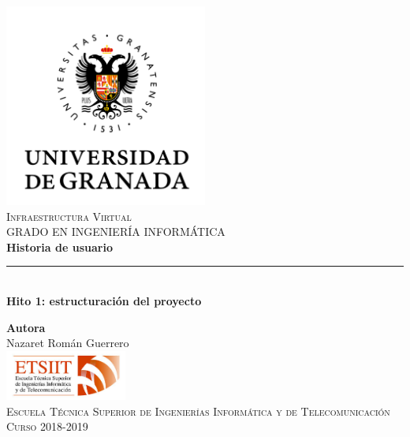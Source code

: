 \documentclass[11pt,a4paper]{article}
\begin{document}
\begin{titlepage}

\begin{minipage}{\textwidth}

\centering
\includegraphics[width=0.5\textwidth]{logo.png}\\

\textsc{\Large Infraestructura Virtual\\[0.2cm]}
\textsc{GRADO EN INGENIERÍA INFORMÁTICA}\\[1cm]

{\Huge\bfseries Historia de usuario\\}
\noindent\rule[-1ex]{\textwidth}{3pt}\\[3.5ex]
{\large\bfseries Hito 1: estructuración del proyecto}
\end{minipage}

\vspace{1.5cm}
\begin{minipage}{\textwidth}
\centering

\textbf{Autora}\\ {Nazaret Román Guerrero}\\[2.5ex]
\includegraphics[width=0.3\textwidth]{etsiit.jpeg}\\[0.1cm]
\vspace{1cm}
\textsc{Escuela Técnica Superior de Ingenierías Informática y de Telecomunicación}\\
\vspace{1cm}
\textsc{Curso 2018-2019}
\end{minipage}
\end{titlepage}

\tableofcontents
\thispagestyle{empty}
\end{document}
